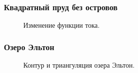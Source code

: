 \documentclass[10pt,utf8,presentation,compress]{beamer}
\begin{document}
\begin{frame}
\frametitle{Квадратный пруд без островов}
	\begin{figure}[H]
		\centering
		\hfill
		\caption{Изменение функции тока.}
	\end{figure}
\end{frame}

\begin{frame}
\frametitle{Озеро Эльтон}
	\begin{figure}[H]
		\centering
		\hfill
		\caption{Контур и триангуляция озера Эльтон.}
	\end{figure}
\end{frame}
\end{document}
